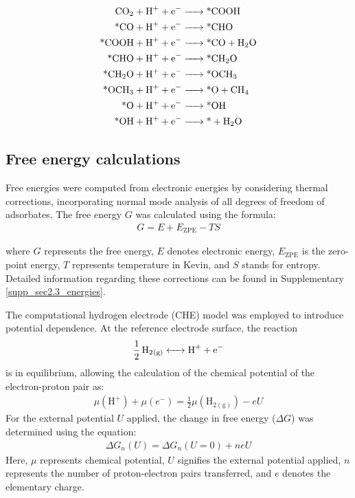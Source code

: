 \begin{align}
\ce{CO2 + H+ + e-          &-> \text{*}COOH}      \label{main_eq1:co2rr1}    \\
\ce{\text{*}CO + H+ + e-   &-> \text{*}CHO}       \label{main_eq3:co2rr3}    \\
\ce{\text{*}COOH + H+ + e- &-> \text{*}CO + H2O}  \label{main_eq2:co2rr2}    \\
\ce{\text{*}CHO + H+ + e-  &-> \text{*}CH2O}      \label{main_eq4:co2rr4}    \\
\ce{\text{*}CH2O + H+ + e- &-> \text{*}OCH3}      \label{main_eq5:co2rr5}    \\
\ce{\text{*}OCH3 + H+ + e- &-> \text{*}O + CH4}   \label{main_eq6:co2rr6}    \\
\ce{\text{*}O + H+ + e-    &-> \text{*}OH}        \label{main_eq7:co2rr7}    \\
\ce{\text{*}OH + H+ + e-   &-> \text{*} + H2O}    \label{main_eq8:co2rr8}
\end{align}

\subsection{Free energy calculations}
Free energies were computed from electronic energies by considering thermal corrections, incorporating normal mode analysis of all degrees of freedom of adsorbates.
The free energy $\textit{G}$ was calculated using the formula:
\begin{align}
G = E + E_{\text{ZPE}} - TS  \label{main_eq9:free_energy}
\end{align}

where $\textit{G}$ represents the free energy, $\textit{E}$ denotes electronic energy, $\textit{E}_{\text{ZPE}}$ is the zero-point energy, $\textit{T}$ represents temperature in Kevin, and $\textit{S}$ stands for entropy.
Detailed information regarding these corrections can be found in Supplementary \cref{supp_sec2.3_energies}.

The computational hydrogen electrode (CHE) model \cite{peterson2010copper, norskov2004origin} was employed to introduce potential dependence.
At the reference electrode surface, the reaction
\begin{align}
\ce{1/2H2_{(g)}  <-> H+ + e-}  \label{main_eq10:che}
\end{align}
is in equilibrium, allowing the calculation of the chemical potential of the electron-proton pair as:
\begin{align}
\mu(\mathrm{H}^+) + \mu(e^-) = \frac{1}{2}\mu(\mathrm{H}_{2(\mathrm{g})}) - eU  \label{main_eq11:che_potential}
\end{align}
For the external potential $\textit{U}$ applied, the change in free energy ($\Delta \textit{G}$) was determined using the equation:
\begin{align}
\Delta G_n(U) = \Delta G_n(U=0) + neU  \label{main_eq12:ext_potential_che}
\end{align}
Here, $\mu$ represents chemical potential, $\textit{U}$ signifies the external potential applied, $\textit{n}$ represents the number of proton-electron pairs transferred, and $\textit{e}$ denotes the elementary charge.


